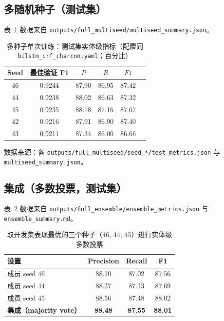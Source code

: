 \documentclass[UTF8,a4paper]{ctexart}
\begin{document}
\subsection{多随机种子（测试集）}
表~\ref{tab:multiseed} 数据来自 \texttt{outputs/full\_multiseed/multiseed\_summary.json}。

\begin{table}[htbp]
  \centering
  \caption{多种子单次训练：测试集实体级指标（配置同 \texttt{bilstm\_crf\_charcnn.yaml}；百分比）}
  \label{tab:multiseed}
  \begin{tabular}{cccccc}
    \toprule
    Seed & 最佳验证 F1 & $P$ & $R$ & $F1$ \\
    \midrule
    46 & 0.9244 & 87.90 & 86.95 & 87.42 \\
    44 & 0.9238 & 88.02 & 86.63 & 87.32 \\
    45 & 0.9235 & 88.18 & 87.16 & 87.67 \\
    42 & 0.9216 & 87.91 & 86.90 & 87.40 \\
    43 & 0.9211 & 87.34 & 86.00 & 86.66 \\
    \bottomrule
  \end{tabular}
\end{table}

\noindent 数据来源：各 \texttt{outputs/full\_multiseed/seed\_*/test\_metrics.json} 与 \texttt{multiseed\_summary.json}。

\subsection{集成（多数投票，测试集）}
表~\ref{tab:ensemble} 数据来自 \texttt{outputs/full\_ensemble/ensemble\_metrics.json} 与 \texttt{ensemble\_summary.md}。

\begin{table}[htbp]
  \centering
  \caption{取开发集表现最优的三个种子（46, 44, 45）进行实体级多数投票}
  \label{tab:ensemble}
  \begin{tabular}{lccc}
    \toprule
    设置 & Precision & Recall & F1 \\
    \midrule
    成员 seed 46 & 88.10 & 87.02 & 87.56 \\
    成员 seed 44 & 88.27 & 87.13 & 87.69 \\
    成员 seed 45 & 88.56 & 87.48 & 88.02 \\
    \textbf{集成（majority vote）} & \textbf{88.48} & \textbf{87.55} & \textbf{88.01} \\
    \bottomrule
  \end{tabular}
\end{table}
\end{document}
